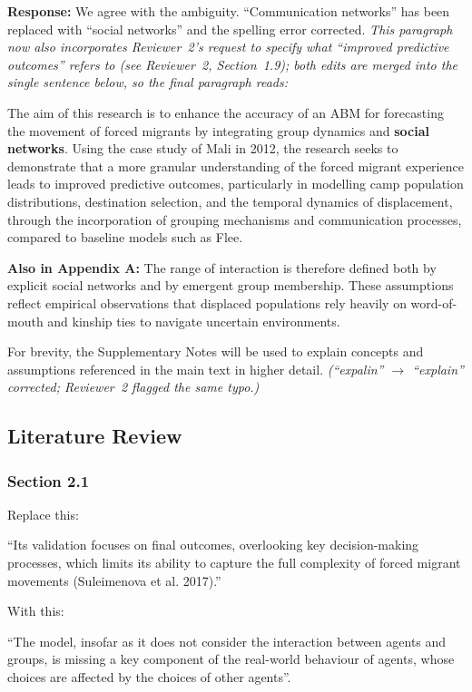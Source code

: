 \documentclass[11pt,a4paper]{article}
\begin{document}
\textbf{Response:} We agree with the ambiguity. ``Communication networks'' has been replaced with
``social networks'' and the spelling error corrected. \emph{This paragraph now also incorporates
Reviewer~2's request to specify what ``improved predictive outcomes'' refers to (see Reviewer~2, Section~1.9);
both edits are merged into the single sentence below, so the final paragraph reads:}

\vspace{0.3cm}
\begin{updatebox}
The aim of this research is to enhance the accuracy of an ABM for forecasting the movement of forced migrants
by integrating group dynamics and \textbf{social networks}. Using the case study of Mali in 2012, the research
seeks to demonstrate that a more granular understanding of the forced migrant experience leads to improved
predictive outcomes, particularly in modelling camp population distributions, destination selection, and the
temporal dynamics of displacement, through the incorporation of grouping mechanisms and communication
processes, compared to baseline models such as Flee.

\medbreak
\textbf{Also in Appendix A:} The range of interaction is therefore defined both by explicit social networks
and by emergent group membership. These assumptions reflect empirical observations that displaced populations
rely heavily on word-of-mouth and kinship ties to navigate uncertain environments.

\medbreak
For brevity, the Supplementary Notes will be used to explain concepts and assumptions referenced in the main
text in higher detail. \emph{(``expalin'' $\rightarrow$ ``explain'' corrected; Reviewer~2 flagged the same typo.)}
\end{updatebox}

\subsection*{Literature Review}

\subsubsection*{Section 2.1}

\begin{reviewbox}
Replace this:

``Its validation focuses on final outcomes, overlooking key decision-making processes, which limits its ability to capture the full complexity of forced migrant movements (Suleimenova et al. 2017).''

With this:

``The model, insofar as it does not consider the interaction between agents and groups, is missing a key component of the real-world behaviour of agents, whose choices are affected by the choices of other agents''.
\end{reviewbox}
\end{document}
